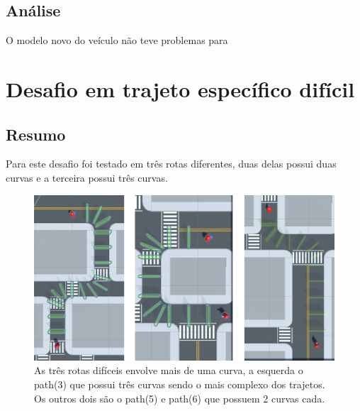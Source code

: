 \subsection*{Análise}
O modelo novo do veículo não teve problemas para 

\section{Desafio em trajeto específico difícil}
\subsection*{Resumo}
Para este desafio foi testado em três rotas diferentes, duas delas possui duas curvas e a terceira possui três curvas.

\begin{figure}[h]
    \centering
    \includegraphics{figs/treinos/desafio-dificil/rotas.png}
    \caption{As três rotas difíceis envolve mais de uma curva, a esquerda o path(3) que possui três curvas sendo o mais complexo dos trajetos. Os outros dois são o path(5) e path(6) que possuem 2 curvas cada.}
\end{figure}

